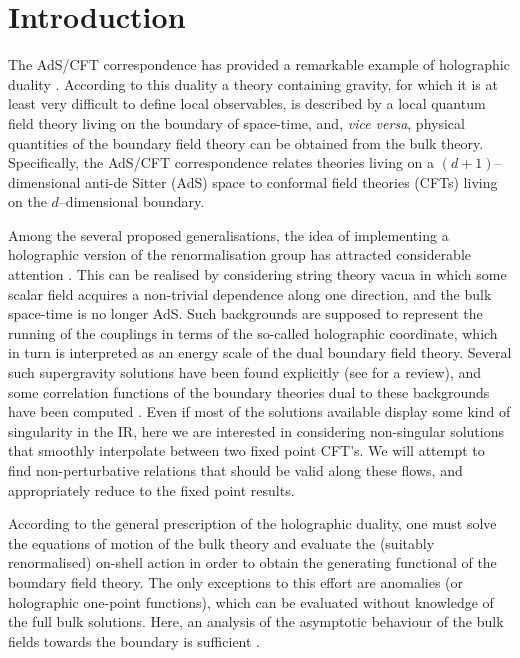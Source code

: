 \documentclass[a4paper,12pt]{article}
\begin{document}
\section{Introduction}
\label{intro}
The AdS/CFT correspondence \cite{Maldacena98,Witten98-1,Gubser98-1} 
has provided a remarkable example of holographic duality
\cite{'tHooft93,Susskind95}. According to this duality a theory 
containing gravity, for which it is at least very 
difficult to define local
observables, is described by a local quantum field theory
living on the boundary of space-time, and, \emph{vice versa}, physical
quantities of the boundary field theory can be obtained from the
bulk theory. Specifically, the AdS/CFT correspondence relates 
theories living on a $(d+1)$--dimensional anti-de Sitter (AdS) space to
conformal field theories (CFTs) living on the $d$--dimensional boundary.

Among the several proposed generalisations, the idea of implementing a 
holographic version of the renormalisation group has attracted considerable 
attention
\cite{Akhmedov98,Balasubrasmanian99,Freedman99a,DeWolfe00a,Alvarez99,Anselmi00a,Bianchi00,Hambli00,Graham00,Warner00,Evans00}.
This can be realised by considering string theory vacua in which 
some scalar field acquires a non-trivial dependence along one
direction, and the bulk space-time is no longer AdS. 
Such backgrounds are supposed to represent the running of the
couplings in terms of the so-called holographic coordinate,
which in turn is interpreted as an energy scale of the dual boundary
field theory. Several such supergravity solutions have been found
explicitly \cite{Girardello99a,Freedman00b,Brandhuber99} (see \cite{Gubser00-1}
for a review), and some correlation functions of the boundary
theories dual to these backgrounds have been computed 
\cite{Chepelev99-1,Rashkov99-3,Anselmi00a,DeWolfe00a,Arutyunov00a,Bianchi00}.  
Even if most of the solutions available display some kind of singularity 
in the IR, here we are interested in considering non-singular solutions 
that smoothly interpolate between two fixed point CFT's. We will 
attempt to find non-perturbative relations that should be valid along
these flows, and appropriately reduce to the fixed point results. 



According to the general prescription of the holographic duality, one
must solve the equations of motion of the bulk theory and evaluate the
(suitably renormalised) on-shell action in order to obtain the 
generating functional of the boundary field theory. The only
exceptions to this effort are anomalies (or holographic one-point
functions), which can be evaluated without knowledge of the full bulk
solutions. Here, an analysis of the asymptotic behaviour of
the bulk fields towards the boundary is sufficient
\cite{Henningson98-2,deHaro00a,Schwimmer:2000cu,Manvelyan01}.
\end{document}
